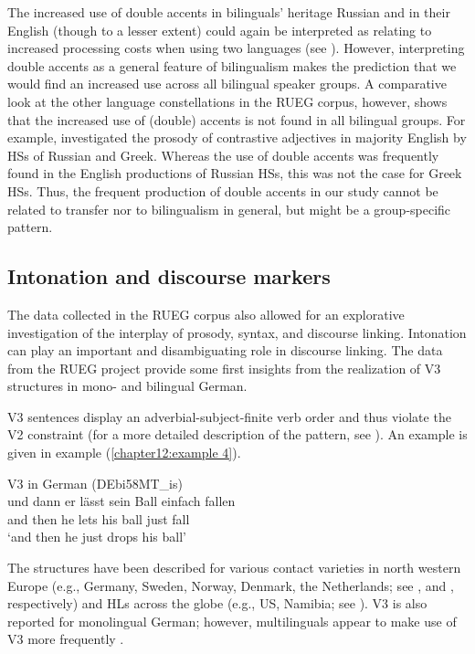 \documentclass[output=paper,colorlinks,citecolor=brown]{langscibook}
\begin{document}
The increased use of double accents in bilinguals’ heritage Russian and in their English (though to a lesser extent) could again be interpreted as relating to increased processing costs when using two languages (see ). However, interpreting double accents as a general feature of bilingualism makes the prediction that we would find an increased use across all bilingual speaker groups. A comparative look at the other language constellations in the RUEG corpus, however, shows that the increased use of (double) accents is not found in all bilingual groups. For example, \citet{Böttcher_2021, Böttcher_2022} investigated the prosody of contrastive adjectives in majority English by HSs of Russian and Greek. Whereas the use of double accents was frequently found in the English productions of Russian HSs, this was not the case for Greek HSs. Thus, the frequent production of double accents in our study cannot be related to transfer nor to bilingualism in general, but might be a group-specific pattern.


\subsection{Intonation and discourse markers}
\label{chapter12:section 4.3}

The data collected in the RUEG corpus also allowed for an explorative investigation of the interplay of prosody, syntax, and discourse linking. Intonation can play an important and disambiguating role in discourse linking. The data from the RUEG project provide some first insights from the realization of V3 structures in mono- and bilingual German.

V3 sentences display an adverbial-subject-finite verb order and thus violate the V2 constraint (for a more detailed description of the pattern, see \cite{chapters/11}). An example is given in example (\ref{chapter12:example 4}).

\begin{exe}
     \ex V3 in German (DEbi58MT\_is) \label{chapter12:example 4}\\
        \gll und dann er lässt sein Ball einfach fallen \\
        and then he lets his ball just fall \\
        \glt `and then he just drops his ball' 
\end{exe}

The structures have been described for various contact varieties in north western Europe (e.g., Germany, Sweden, Norway, Denmark, the Netherlands; see \cite{Wiese_2009, Kotsinas_1992, Opsahl_2009, Quist_2000}, and \cite{Meeleen_Mourigh_Cheng_2020}, respectively) and HLs across the globe (e.g., US, Namibia; see \cite{Tracy_Lattey_2009, Wiese_Müller_2018}). V3 is also reported for monolingual German; however, multilinguals appear to make use of V3 more frequently \citep{Wiese_Müller_2018}.
\end{document}
